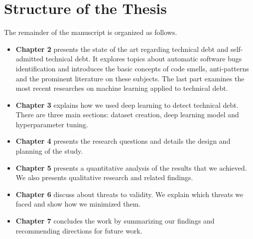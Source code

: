\section{Structure of the Thesis}
The remainder of the manuscript is organized as follows.
\begin{itemize}
 \item \textbf{Chapter 2} presents the state of the art regarding technical debt and self-admitted technical debt. It explores topics about automatic software bugs identification and introduces the basic concepts of code smells, anti-patterns and the prominent literature on these subjects. The last part examines the most recent researches on machine learning applied to technical debt.
 \item \textbf{Chapter 3} explains how we used deep learning to detect technical debt. There are three main sections: dataset creation, deep learning model and hyperparameter tuning.
 \item \textbf{Chapter 4} presents the research questions and details the design and planning of the study.
 \item \textbf{Chapter 5} presents a quantitative analysis of the results that we achieved. We also presents qualitative research and related findings.
 \item \textbf{Chapter 6} discuss about threats to validity. We explain which threats we faced and show how we minimized them.
 \item \textbf{Chapter 7} concludes the work by summarizing our findings and recommending directions for future work.
\end{itemize}











